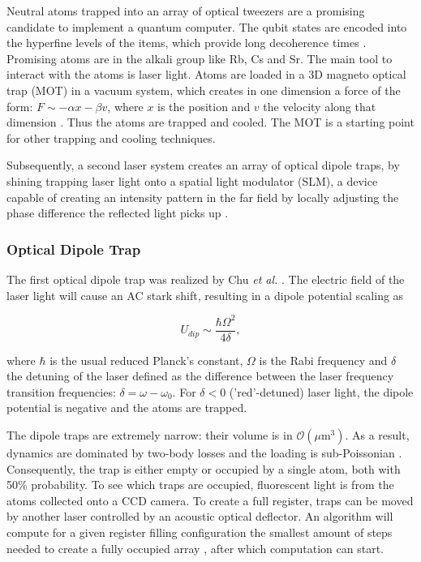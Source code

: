 Neutral atoms trapped into an array of optical tweezers are a promising candidate to implement a quantum computer. The qubit states are encoded into the hyperfine levels of the items, which provide long decoherence times \cite{Henriet2020}. Promising atoms are in the alkali group like Rb, Cs and Sr. The main tool to interact with the atoms is laser light. Atoms are loaded in a 3D magneto optical trap (MOT) in a vacuum system, which creates in one dimension a force of the form: $F \sim -\alpha x - \beta v$, where $x$ is the position and $v$ the velocity along that dimension \cite{Metcalf1999}. Thus the atoms are trapped and cooled. The MOT is a starting point for other trapping and cooling techniques.

Subsequently, a second laser system creates an array of \cite{Schlosser2001,Bergamini2004} optical dipole traps, by shining trapping laser light onto a spatial light modulator (SLM), a device capable of creating an intensity pattern in the far field by locally adjusting the phase difference the reflected light picks up \cite{Bijnen2015}.

\subsubsection*{Optical Dipole Trap}

The first optical dipole trap was realized by Chu \textit{et al.} \cite{Chu1986}. The electric field of the laser light will cause an AC stark shift, resulting in a dipole potential scaling as \cite{Metcalf1999,Muldoon2012}

\begin{equation}
	U_{dip} \sim \frac{\hbar \Omega^2}{4\delta},
\end{equation}

where $\hbar$ is the usual reduced Planck's constant, $\Omega$ is the Rabi frequency and $\delta$ the detuning of the laser defined as the difference between the laser frequency transition frequencies: $\delta = \omega - \omega_0$. For $\delta<0$ ('red'-detuned) laser light, the dipole potential is negative and the atoms are trapped.

The dipole traps are extremely narrow: their volume is in $\mathcal{O}(\mu \text{m}^3)$. As a result, dynamics are dominated by two-body losses and the loading is sub-Poissonian \cite{Schlosser2002,Browaeys2016}. Consequently, the trap is either empty or occupied by a single atom, both with 50\% probability. To see which traps are occupied, fluorescent light is from the atoms collected onto a CCD camera. To create a full register, traps can be moved by another laser controlled by an acoustic optical deflector. An algorithm will compute for a given register filling configuration the smallest amount of steps needed to create a fully occupied array \cite{Barredo2016}, after which computation can start.

